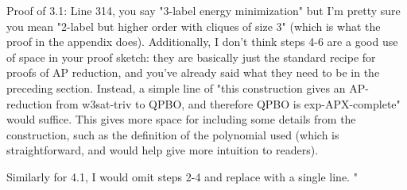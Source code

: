 Proof of 3.1: Line 314, you say "3-label energy minimization" but I'm pretty sure you mean "2-label but higher order with cliques of size 3" (which is what the proof in the appendix does). 
Additionally, I don't think steps 4-6 are a good use of space in your proof sketch: they are basically just the standard recipe for proofs of AP reduction, and you've already said what they need to be in the preceding section. Instead, a simple line of "this construction gives an AP-reduction from w3sat-triv to QPBO, and therefore QPBO is exp-APX-complete" would suffice. This gives more space for including some details from the construction, such as the definition of the polynomial used (which is straightforward, and would help give more intuition to readers).

Similarly for 4.1, I would omit steps 2-4 and replace with a single line.
"
